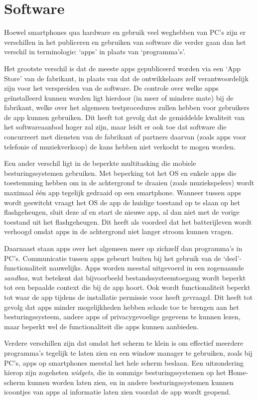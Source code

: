 \section{Software}

Hoewel smartphones qua hardware en gebruik veel weghebben van PC's zijn er verschillen in het publiceren en gebruiken van software die verder gaan dan het verschil in terminologie: `apps' in plaats van `programma's'.

Het grootste verschil is dat de meeste apps gepubliceerd worden via een `App Store' van de fabrikant, in plaats van dat de ontwikkelaars zelf verantwoordelijk zijn voor het verspreiden van de software.
De controle over welke apps ge\"installeerd kunnen worden ligt hierdoor (in meer of mindere mate) bij de fabrikant, welke over het algemeen testprocedures zullen hebben voor gebruikers de app kunnen gebruiken.
Dit heeft tot gevolg dat de gemiddelde kwaliteit van het softwareaanbod hoger zal zijn, maar leidt er ook toe dat software die concurreert met diensten van de fabrikant of partners daarvan (zoals apps voor telefonie of muziekverkoop) de kans hebben niet verkocht te mogen worden.

Een ander verschil ligt in de beperkte multitasking die mobiele besturingssystemen gebruiken.
Met beperking tot het OS en enkele apps die toestemming hebben om in de achtergrond te draaien (zoals muziekspelers) wordt maximaal \'e\'en app tegelijk gedraaid op een smartphone.
Wanneer tussen apps wordt geswitcht vraagt het OS de app de huidige toestand op te slaan op het flashgeheugen, sluit deze af en start de nieuwe app, al dan niet met de vorige toestand uit het flashgeheugen.
Dit heeft als voordeel dat het batterijleven wordt verhoogd omdat apps in de achtergrond niet langer stroom kunnen vragen. \citep{extremetechmulti}

Daarnaast staan apps over het algemeen meer op zichzelf dan programma's in PC's.
Communicatie tussen apps gebeurt buiten bij het gebruik van de `deel'-functionaliteit nauwelijks.
Apps worden meestal uitgevoerd in een zogenaamde \emph{sandbox}, wat betekent dat bijvoorbeeld bestandssysteemtoegang wordt beperkt tot een bepaalde context die bij de app hoort.
Ook wordt functionaliteit beperkt tot waar de app tijdens de installatie permissie voor heeft gevraagd.
Dit heeft tot gevolg dat apps minder mogelijkheden hebben schade toe te brengen aan het besturingssysteem, andere apps of privacygevoelige gegevens te kunnen lezen, maar beperkt wel de functionaliteit die apps kunnen aanbieden.

Verdere verschillen zijn dat omdat het scherm te klein is om effectief meerdere programma's tegelijk te laten zien en een window manager te gebruiken, zoals bij PC's, apps op smartphones meestal het hele scherm beslaan. Een uitzondering hierop zijn zogeheten \emph{widgets}, die in sommige besturingssystemen op het Home-scherm kunnen worden laten zien, en in andere besturingssystemen kunnen icoontjes van apps al informatie laten zien voordat de app wordt geopend.
